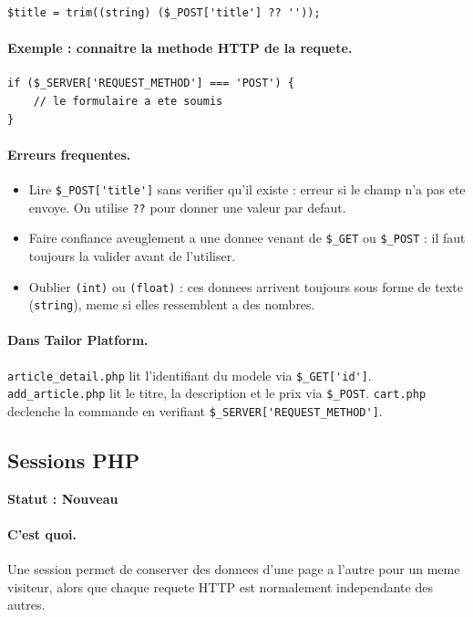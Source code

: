 \documentclass[11pt,a4paper]{article}
\newcommand{\statut}[1]{\textbf{Statut : #1}}
\begin{document}
\begin{lstlisting}
$title = trim((string) ($_POST['title'] ?? ''));
\end{lstlisting}

\paragraph{Exemple : connaitre la methode HTTP de la requete.}

\begin{lstlisting}
if ($_SERVER['REQUEST_METHOD'] === 'POST') {
    // le formulaire a ete soumis
}
\end{lstlisting}

\paragraph{Erreurs frequentes.}
\begin{itemize}
  \item Lire \verb|$_POST['title']| sans verifier qu'il existe : erreur si
  le champ n'a pas ete envoye. On utilise \verb|??| pour donner une valeur
  par defaut.
  \item Faire confiance aveuglement a une donnee venant de \verb|$_GET| ou
  \verb|$_POST| : il faut toujours la valider avant de l'utiliser.
  \item Oublier \verb|(int)| ou \verb|(float)| : ces donnees arrivent
  toujours sous forme de texte (\verb|string|), meme si elles ressemblent a
  des nombres.
\end{itemize}

\paragraph{Dans Tailor Platform.}
\verb|article_detail.php| lit l'identifiant du modele via \verb|$_GET['id']|.
\verb|add_article.php| lit le titre, la description et le prix via
\verb|$_POST|. \verb|cart.php| declenche la commande en verifiant
\verb|$_SERVER['REQUEST_METHOD']|.

\subsection{Sessions PHP}

\statut{Nouveau}

\paragraph{C'est quoi.}
Une session permet de conserver des donnees d'une page a l'autre pour un
meme visiteur, alors que chaque requete HTTP est normalement independante
des autres.
\end{document}
